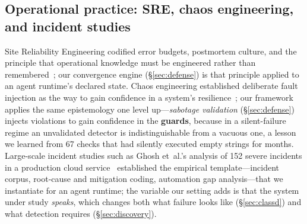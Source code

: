 \subsection{Operational practice: SRE, chaos engineering, and incident
studies}

Site Reliability Engineering codified error budgets, postmortem culture,
and the principle that operational knowledge must be engineered rather
than remembered~\cite{beyer2016sre}; our convergence engine
(\S\ref{sec:defense}) is that principle applied to an agent runtime's
declared state. Chaos engineering established deliberate fault injection
as the way to gain confidence in a system's
resilience~\cite{basiri2016chaos}; our framework applies the same
epistemology one level up---\emph{sabotage validation}
(\S\ref{sec:defense}) injects violations to gain confidence in the
\textbf{guards}, because in a silent-failure regime an unvalidated
detector is indistinguishable from a vacuous one, a lesson we learned
from 67 checks that had silently executed empty strings for months.
Large-scale incident studies such as Ghosh et~al.'s analysis of 152
severe incidents in a production cloud service~\cite{ghosh2022fight}
established the empirical template---incident corpus, root-cause and
mitigation coding, automation gap analysis---that we instantiate for an
agent runtime; the variable our setting adds is that the system under
study \emph{speaks}, which changes both what failure looks like
(\S\ref{sec:classd}) and what detection requires
(\S\ref{sec:discovery}).
